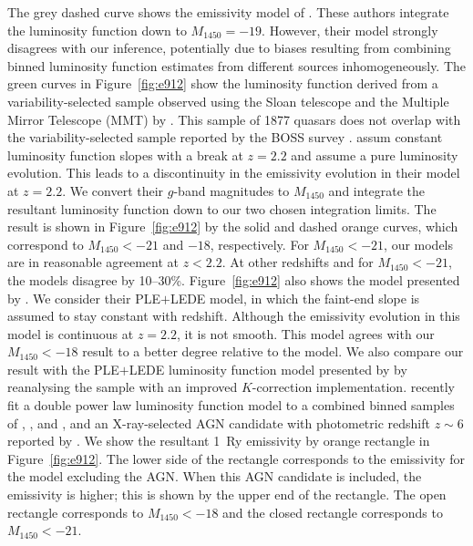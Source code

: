 \documentclass[a4paper,fleqn,usenatbib]{mnras}
\begin{document}
The grey dashed curve shows the emissivity model of
\citet{2017MNRAS.466.1160M}.  These authors integrate the luminosity
function down to $M_{1450}=-19$.  However, their model strongly
disagrees with our inference, potentially due to biases resulting from
combining binned luminosity function estimates from different sources
inhomogeneously.  The green curves in Figure~\ref{fig:e912} show the
luminosity function derived from a variability-selected sample
observed using the Sloan telescope and the Multiple Mirror Telescope
(MMT) by \citet{2013A&A...551A..29P}.  This sample of 1877 quasars
does not overlap with the variability-selected sample reported by the
BOSS survey \citep{2013ApJ...773...14R}.  \citet{2013A&A...551A..29P}
assum constant luminosity function slopes with a break at $z=2.2$ and
assume a pure luminosity evolution.  This leads to a discontinuity in
the emissivity evolution in their model at $z=2.2$.  We convert their
$g$-band magnitudes to $M_{1450}$ and integrate the resultant
luminosity function down to our two chosen integration limits.  The
result is shown in Figure~\ref{fig:e912} by the solid and dashed
orange curves, which correspond to $M_{1450}<-21$ and $-18$,
respectively.  For $M_{1450}<-21$, our models are in reasonable
agreement at $z<2.2$.  At other redshifts and for $M_{1450}<-21$, the
models disagree by 10--30\%.  Figure~\ref{fig:e912} also shows the
model presented by \citet{2016A&A...587A..41P}.  We consider their
PLE$+$LEDE model, in which the faint-end slope is assumed to stay
constant with redshift.  Although the emissivity evolution in this
model is continuous at $z=2.2$, it is not smooth.  This model agrees
with our $M_{1450}<-18$ result to a better degree relative to the
\citet{2013A&A...551A..29P} model.  We also compare our result with
the PLE$+$LEDE luminosity function model presented by
\citet{2017A&A...608A..64C} by reanalysing the
\citet{2016A&A...587A..41P} sample with an improved $K$-correction
implementation.  \citet{2017ApJ...847L..15O} recently fit a double
power law luminosity function model to a combined binned samples of
\citet{2016ApJ...833..222J}, \citet{2010AJ....139..906W}, and
\citet{2015ApJ...798...28K}, and an X-ray-selected AGN candidate with
photometric redshift $z\sim 6$ reported by
\citet{2018MNRAS.474.2904P}.  We show the resultant 1~Ry emissivity by
orange rectangle in Figure~\ref{fig:e912}.  The lower side of the
rectangle corresponds to the emissivity for the
\citet{2017ApJ...847L..15O} model excluding the
\citet{2018MNRAS.474.2904P} AGN.  When this AGN candidate is included,
the emissivity is higher; this is shown by the upper end of the
rectangle.  The open rectangle corresponds to $M_{1450}<-18$ and the
closed rectangle corresponds to $M_{1450}<-21$.
\end{document}
